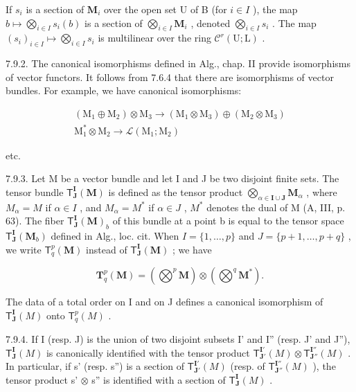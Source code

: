 If \(s_i\) is a section of \(\mathbf{M}_i\) over the open set U of B (for \(i \in I\) ), the map \(b \mapsto \bigotimes_{i \in I} s_i(b)\) is a section of \(\bigotimes_{i \in I} \mathbf{M}_i\) , denoted \(\bigotimes_{i \in I} s_i\) . The map \((s_i)_{i \in I} \mapsto \bigotimes_{i \in I} s_i\) is multilinear over the ring \(\mathcal{C}^r(\mathrm{U}; \mathrm{L})\) .

7.9.2. The canonical isomorphisms defined in Alg., chap. II provide isomorphisms of vector functors. It follows from 7.6.4 that there are isomorphisms of vector bundles. For example, we have canonical isomorphisms:

\[
\begin{array}{c} (\mathrm{M} _ {1} \oplus \mathrm{M} _ {2}) \otimes \mathrm{M} _ {3} \longrightarrow (\mathrm{M} _ {1} \otimes \mathrm{M} _ {3}) \oplus (\mathrm{M} _ {2} \otimes \mathrm{M} _ {3}) \\ \mathrm{M} _ {1} ^ {*} \otimes \mathrm{M} _ {2} \longrightarrow \mathcal {L} (\mathrm{M} _ {1}; \mathrm{M} _ {2}) \end{array}
\]

etc.

7.9.3. Let M be a vector bundle and let I and J be two disjoint finite sets. The tensor bundle \(\mathsf{T}_{\mathbf{J}}^{\mathbf{I}}(\mathbf{M})\) is defined as the tensor product \(\bigotimes_{\alpha\in\mathbf{I}\cup\mathbf{J}}\mathbf{M}_{\alpha}\) , where \(M_{\alpha}=M\) if \(\alpha\in I\) , and \(M_{\alpha}=M^{*}\) if \(\alpha\in J\) , \(M^{*}\) denotes the dual of M (A, III, p. 63). The fiber \(\mathsf{T}_{\mathbf{J}}^{\mathbf{I}}(\mathbf{M})_{b}\) of this bundle at a point b is equal to the tensor space \(\mathsf{T}_{\mathbf{J}}^{\mathbf{I}}(\mathbf{M}_{b})\) defined in Alg., loc. cit. When \(I=\{1,\ldots,p\}\) and \(J=\{p+1,\ldots,p+q\}\) , we write \(\mathsf{T}_{q}^{p}(\mathbf{M})\) instead of \(\mathsf{T}_{\mathbf{J}}^{\mathbf{I}}(\mathbf{M})\) ; we have

\[
\mathbf {T} _ {q} ^ {p} (\mathbf {M}) = (\bigotimes^ {p} \mathbf {M}) \otimes (\bigotimes^ {q} \mathbf {M} ^ {*}).
\]

The data of a total order on I and on J defines a canonical isomorphism of \(\mathsf{T}_{\mathbf{J}}^{\mathbf{I}}(M)\) onto \(\mathsf{T}_{q}^{p}(M)\) .

7.9.4. If I (resp. J) is the union of two disjoint subsets I' and I'' (resp. J' and J''), \(\mathsf{T}_{\mathbf{J}}^{\mathbf{I}}(M)\) is canonically identified with the tensor product \(\mathsf{T}_{\mathbf{J}'}^{\mathbf{I}'}(M) \otimes \mathsf{T}_{\mathbf{J}''}^{\mathbf{I}''}(M)\) . In particular, if s' (resp. s'') is a section of \(\mathsf{T}_{\mathbf{J}'}^{\mathbf{I}'}(M)\) (resp. of \(\mathsf{T}_{\mathbf{J}''}^{\mathbf{I}''}(M)\) ), the tensor product s' \(\otimes\) s'' is identified with a section of \(\mathsf{T}_{\mathbf{J}}^{\mathbf{I}}(M)\) .

